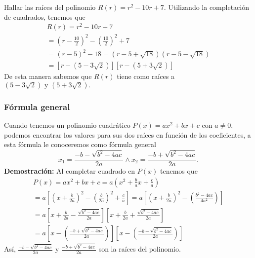 {{        \begin{example}
            Hallar las raíces del polinomio $R(r) = r^2 - 10r + 7.$
            \solution
            {
                Utilizando la completación de cuadrados, tenemos que
                \begin{gather*}
                    R(r) = r^2 - 10r + 7\\
                    = \left( r - \frac{10}{2} \right)^2 - \left( \frac{10}{2} \right)^2 + 7\\
                    = \left( r - 5 \right)^2 - 18
                    = \left( r - 5 + \sqrt {18} \right)\left( r - 5 - \sqrt {18} \right)\\
                    = \left[ r - \left( 5 - 3\sqrt {2} \right)\right]\left[ r - \left( 5 + 3\sqrt {2} \right)\right]
                \end{gather*}
                De esta manera sabemos que $R(r)$ tiene como raíces a $\left( 5 - 3\sqrt {2} \right) \mbox{ y } \left( 5 + 3\sqrt {2} \right).$
            }
        \end{example}
    }
    \subsubsection{Fórmula general}
    {
        Cuando tenemos un polinomio cuadrático $P(x) = ax^2 + bx + c$ con $a \neq 0$, podemos encontrar los valores para sus dos raíces en función de los coeficientes, a esta fórmula le conoceremos como fórmula general \[x_1 = \frac{-b - \sqrt {b^2 - 4ac}}{2a} \land x_2 = \frac{-b + \sqrt {b^2 - 4ac}}{2a}.\]
        \textbf{Demostración:} Al completar cuadrado en $P(x)$ tenemos que
        \begin{gather*}
            P(x) = ax^2 + bx + c = a \left( x^2 + \frac{b}{a}x + \frac{c}{a} \right) \\
            = a \left[ \left( x + \frac{b}{2a} \right)^2 - \left( \frac{b}{2a} \right)^2 + \frac{c}{a} \right]
            = a \left[ \left( x + \frac{b}{2a} \right)^2 - \left( \frac{b^2 - 4ac}{4a^2}\right) \right] \\
            = a \left[ x + \frac{b}{2a} - \frac{\sqrt {b^2 - 4ac}}{2a}\right]\left[ x + \frac{b}{2a} + \frac{\sqrt {b^2 - 4ac}}{2a}\right] \\
            = a \left[ x - \left( \frac{-b + \sqrt {b^2 - 4ac}}{2a} \right) \right]\left[ x - \left( \frac{-b - \sqrt {b^2 - 4ac}}{2a} \right) \right]
        \end{gather*}
        Así, $\frac{-b - \sqrt {b^2 - 4ac}}{2a}$ y $\frac{-b + \sqrt {b^2 - 4ac}}{2a}$ son la raíces del polinomio.
    }

}
